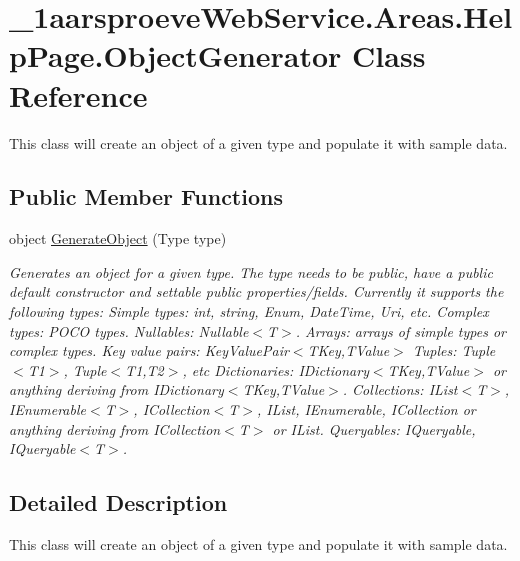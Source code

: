 \hypertarget{class__1aarsproeve_web_service_1_1_areas_1_1_help_page_1_1_object_generator}{}\section{\+\_\+1aarsproeve\+Web\+Service.\+Areas.\+Help\+Page.\+Object\+Generator Class Reference}
\label{class__1aarsproeve_web_service_1_1_areas_1_1_help_page_1_1_object_generator}


This class will create an object of a given type and populate it with sample data.  


\subsection*{Public Member Functions}
\begin{DoxyCompactItemize}
\item 
object \hyperlink{class__1aarsproeve_web_service_1_1_areas_1_1_help_page_1_1_object_generator_ad47fd6b8894401475144cf522d8767d0}{Generate\+Object} (Type type)
\begin{DoxyCompactList}\small\item\em Generates an object for a given type. The type needs to be public, have a public default constructor and settable public properties/fields. Currently it supports the following types\+: Simple types\+: int, string, Enum, Date\+Time, Uri, etc. Complex types\+: P\+O\+C\+O types. Nullables\+: Nullable$<$\+T$>$. Arrays\+: arrays of simple types or complex types. Key value pairs\+: Key\+Value\+Pair$<$\+T\+Key,\+T\+Value$>$ Tuples\+: Tuple$<$\+T1$>$, Tuple$<$\+T1,\+T2$>$, etc Dictionaries\+: I\+Dictionary$<$\+T\+Key,\+T\+Value$>$ or anything deriving from I\+Dictionary$<$\+T\+Key,\+T\+Value$>$. Collections\+: I\+List$<$\+T$>$, I\+Enumerable$<$\+T$>$, I\+Collection$<$\+T$>$, I\+List, I\+Enumerable, I\+Collection or anything deriving from I\+Collection$<$\+T$>$ or I\+List. Queryables\+: I\+Queryable, I\+Queryable$<$\+T$>$. \end{DoxyCompactList}\end{DoxyCompactItemize}


\subsection{Detailed Description}
This class will create an object of a given type and populate it with sample data. 



